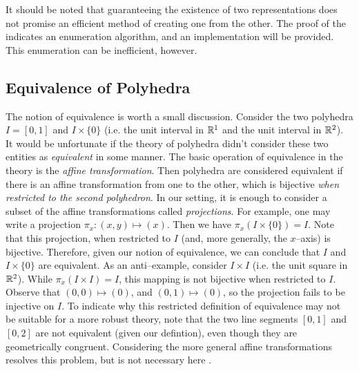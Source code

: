 It should be noted that guaranteeing the existence of two representations does not promise an efficient method of creating one from the other.  The proof of the \MWT{} indicates an enumeration algorithm, and an implementation will be provided.  This enumeration can be inefficient, however.

\subsection{Equivalence of Polyhedra}  The notion of equivalence is worth a small discussion.  Consider the two polyhedra $I = [0,1]$ and $I\times\{0\}$ (i.e. the unit interval in $\mathbb{R}^1$ and the unit interval in $\mathbb{R}^2$).  It would be unfortunate if the theory of polyhedra didn't consider these two entities as \textit{equivalent} in some manner.  The basic operation of equivalence in the theory is the \textit{affine transformation}.  Then polyhedra are considered equivalent if there is an affine transformation from one to the other, which is bijective \textit{when restricted to the second polyhedron}.  In our setting, it is enough to consider a subset of the affine transformations called \textit{projections}.  For example, one may write a projection $\pi_x: (x,y) \mapsto (x)$.  Then we have $\pi_x (I \times \{0\}) = I$.  Note that this projection, when restricted to $I$ (and, more generally, the $x$--axis) is bijective.  Therefore, given our notion of equivalence, we can conclude that $I$ and $I\times \{0\}$ are equivalent.  As an anti--example, consider $I\times I$ (i.e. the unit square in $\mathbb{R}^2$).  While $\pi_x(I\times I) = I$, this mapping is not bijective when restricted to $I$.  Observe that $(0,0) \mapsto (0)$, and $(0,1) \mapsto (0)$, so the projection fails to be injective on $I$.  To indicate why this restricted definition of equivalence may not be suitable for a more robust theory, note that the two line segments $[0,1]$ and $[0,2]$ are not equivalent (given our defintion), even though they are geometrically congruent.  Considering the more general affine transformations resolves this problem, but is not necessary here .

